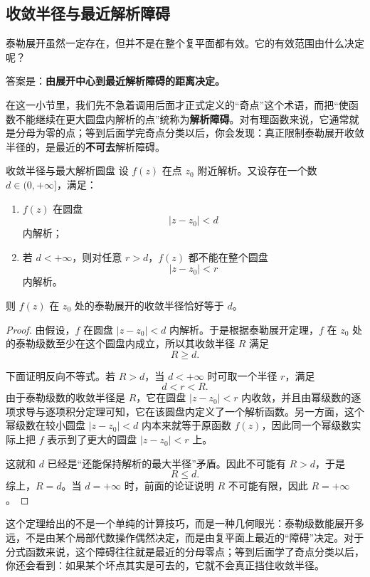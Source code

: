 \subsection{收敛半径与最近解析障碍}

泰勒展开虽然一定存在，但并不是在整个复平面都有效。它的有效范围由什么决定呢？

答案是：\textbf{由展开中心到最近解析障碍的距离决定。}

\begin{tishi}
在这一小节里，我们先不急着调用后面才正式定义的``奇点''这个术语，而把``使函数不能继续在更大圆盘内解析的点''统称为\textbf{解析障碍}。对有理函数来说，它通常就是分母为零的点；等到后面学完奇点分类以后，你会发现：真正限制泰勒展开收敛半径的，是最近的\textbf{不可去}解析障碍。
\end{tishi}

\begin{dingli}{收敛半径与最大解析圆盘}{}
设 $f(z)$ 在点 $z_0$ 附近解析。又设存在一个数 $d\in(0,+\infty]$，满足：
\begin{enumerate}
    \item $f(z)$ 在圆盘
    \[
        |z-z_0|<d
    \]
    内解析；
    \item 若 $d<+\infty$，则对任意 $r>d$，$f(z)$ 都不能在整个圆盘
    \[
        |z-z_0|<r
    \]
    内解析。
\end{enumerate}
则 $f(z)$ 在 $z_0$ 处的泰勒展开的收敛半径恰好等于 $d$。
\end{dingli}

\begin{proof}
由假设，$f$ 在圆盘 $|z-z_0|<d$ 内解析。于是根据泰勒展开定理，$f$ 在 $z_0$ 处的泰勒级数至少在这个圆盘内成立，所以其收敛半径 $R$ 满足
\[
    R\ge d.
\]

下面证明反向不等式。若 $R>d$，当 $d<+\infty$ 时可取一个半径 $r$，满足
\[
    d<r<R.
\]
由于泰勒级数的收敛半径是 $R$，它在圆盘 $|z-z_0|<r$ 内收敛，并且由幂级数的逐项求导与逐项积分定理可知，它在该圆盘内定义了一个解析函数。另一方面，这个幂级数在较小圆盘 $|z-z_0|<d$ 内本来就等于原函数 $f(z)$，因此同一个幂级数实际上把 $f$ 表示到了更大的圆盘 $|z-z_0|<r$ 上。

这就和 $d$ 已经是``还能保持解析的最大半径''矛盾。因此不可能有 $R>d$，于是
\[
    R\le d.
\]
综上，$R=d$。当 $d=+\infty$ 时，前面的论证说明 $R$ 不可能有限，因此 $R=+\infty$。
\end{proof}

\begin{zhu}{}{}
这个定理给出的不是一个单纯的计算技巧，而是一种几何眼光：泰勒级数能展开多远，不是由某个局部代数操作偶然决定，而是由复平面上最近的``障碍''决定。对于分式函数来说，这个障碍往往就是最近的分母零点；等到后面学了奇点分类以后，你还会看到：如果某个坏点其实是可去的，它就不会真正挡住收敛半径。
\end{zhu}

